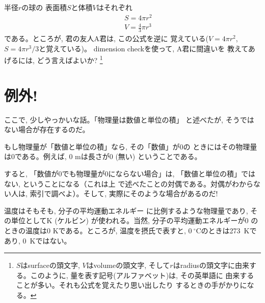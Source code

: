 \begin{q}\label{q:sphere_SV_dimcheck} 半径$r$の球の
表面積$S$と体積$V$はそれぞれ
\begin{eqnarray}
&&S=4\pi r^2\label{eq:ball_surface}\\
&&V=\frac{4}{3}\pi r^3\label{eq:ball_volume}
\end{eqnarray}
である。ところが, 君の友人A君は, この公式を逆に
覚えている($V=4\pi r^2$, $S=4\pi r^3/3$と覚えている)。
dimension checkを使って, A君に間違いを
教えてあげるには, どう言えばよいか?
\footnote{$S$はsurfaceの頭文字, $V$はvolumeの頭文字, 
そして$r$はradiusの頭文字に由来する。このように, 
量を表す記号(アルファベット)は, その英単語に
由来することが多い。それも公式を覚えたり思い出したり
するときの手がかりになる。}\end{q}

\hv


\section{例外!}
ここで, 少しやっかいな話。「物理量は数値と単位の積」
と述べたが, そうではない場合が存在するのだ。

もし物理量が「数値と単位の積」なら, その「数値」が0の
ときにはその物理量は0である。例えば, 0 mは長さが0 (無い)
ということである。

すると, 「数値が0でも物理量が0にならない場合」は, 
「数値と単位の積」ではない, ということになる（これは上
で述べたことの対偶である。対偶がわからない人は, 
索引で調べよ）。そして, 実際にそのような場合があるのだ!

\begin{exmpl} 温度はそもそも, 分子の平均運動エネルギー
に比例するような物理量であり, その単位としてK (ケルビン)
が使われる。当然, 分子の平均運動エネルギーが0
のときの温度は0 Kである。ところが, 温度を摂氏で表すと, 
$0\ {}^\circ\mathrm{C}$のときは273~Kであり, 0~Kではない。
\end{exmpl}

